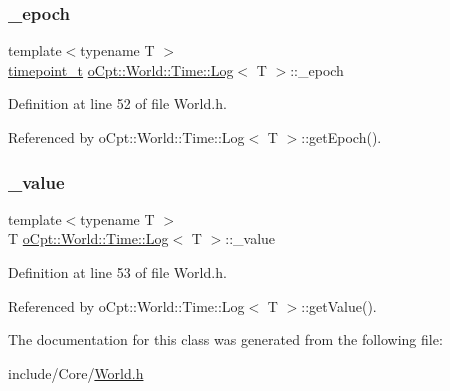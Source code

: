 \subsubsection{\texorpdfstring{\+\_\+epoch}{\_epoch}}
{\footnotesize\ttfamily template$<$typename T $>$ \\
\hyperlink{classo_cpt_1_1_world_1_1_time_a6a6e782c3c90622c1c7070b0a223ec4c}{timepoint\+\_\+t} \hyperlink{classo_cpt_1_1_world_1_1_time_1_1_log}{o\+Cpt\+::\+World\+::\+Time\+::\+Log}$<$ T $>$\+::\+\_\+epoch\hspace{0.3cm}{\ttfamily [private]}}



Definition at line 52 of file World.\+h.



Referenced by o\+Cpt\+::\+World\+::\+Time\+::\+Log$<$ T $>$\+::get\+Epoch().

\hypertarget{classo_cpt_1_1_world_1_1_time_1_1_log_a63eb942576004d0b6ff7b1cbea7deb9c}{}\label{classo_cpt_1_1_world_1_1_time_1_1_log_a63eb942576004d0b6ff7b1cbea7deb9c} 
\subsubsection{\texorpdfstring{\+\_\+value}{\_value}}
{\footnotesize\ttfamily template$<$typename T $>$ \\
T \hyperlink{classo_cpt_1_1_world_1_1_time_1_1_log}{o\+Cpt\+::\+World\+::\+Time\+::\+Log}$<$ T $>$\+::\+\_\+value\hspace{0.3cm}{\ttfamily [private]}}



Definition at line 53 of file World.\+h.



Referenced by o\+Cpt\+::\+World\+::\+Time\+::\+Log$<$ T $>$\+::get\+Value().



The documentation for this class was generated from the following file\+:\begin{DoxyCompactItemize}
\item 
include/\+Core/\hyperlink{_world_8h}{World.\+h}\end{DoxyCompactItemize}
